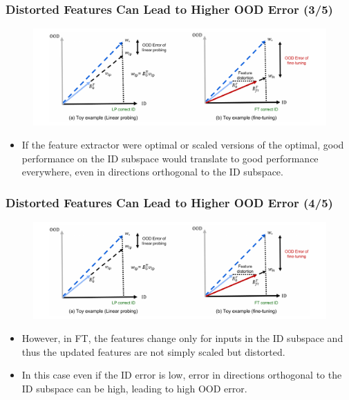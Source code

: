 \documentclass[16pt,aspectratio=169]{beamer}
\begin{document}
\begin{frame}
    \frametitle{Distorted Features Can Lead to Higher OOD Error (3/5)}
    \begin{figure}[htbp]
        \centering
        \includegraphics[width=\textwidth]{figures/toy-example.png}
    \end{figure}

    \begin{itemize}
        \item If the feature extractor were optimal or scaled versions of the optimal, good performance on the ID subspace would translate to good performance everywhere, even in directions orthogonal to the ID subspace.
    \end{itemize}

\end{frame}

\begin{frame}
    \frametitle{Distorted Features Can Lead to Higher OOD Error (4/5)}
    \begin{figure}[htbp]
        \centering
        \includegraphics[width=\textwidth]{figures/toy-example.png}
    \end{figure}

    \begin{itemize}
        \item However, in FT, the features change only for inputs in the ID subspace and thus the updated features are not simply scaled but distorted.
        \item In this case even if the ID error is low, error in directions orthogonal to the ID subspace can be high, leading to high OOD error.
    \end{itemize}

\end{frame}
\end{document}
